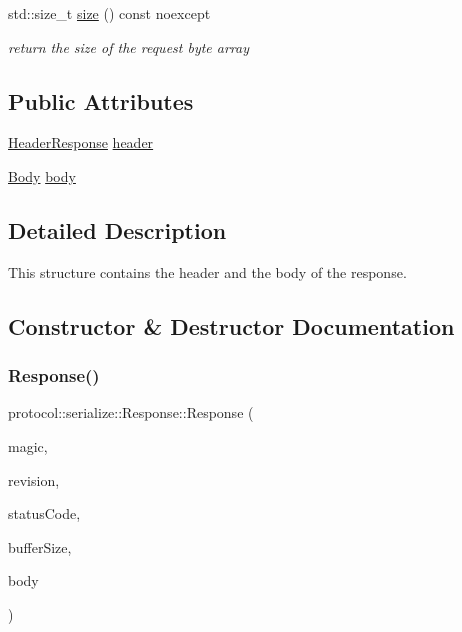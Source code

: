 \begin{DoxyCompactItemize}
\mbox{\label{structprotocol_1_1serialize_1_1_response_ac86f4b18ebeacf1497a14b023c301f62}} 
std\+::size\+\_\+t \hyperlink{structprotocol_1_1serialize_1_1_response_ac86f4b18ebeacf1497a14b023c301f62}{size} () const noexcept
\begin{DoxyCompactList}\small\item\em return the size of the request byte array \end{DoxyCompactList}\end{DoxyCompactItemize}
\subsection*{Public Attributes}
\begin{DoxyCompactItemize}
\item 
\hyperlink{structprotocol_1_1serialize_1_1_header_response}{Header\+Response} \hyperlink{structprotocol_1_1serialize_1_1_response_ad2391bc2916947b5ac734ddaa6570442}{header}
\item 
\hyperlink{classprotocol_1_1serialize_1_1_body}{Body} \hyperlink{structprotocol_1_1serialize_1_1_response_a6706ef7e0a22f2ba78e1b6ff12955568}{body}
\end{DoxyCompactItemize}


\subsection{Detailed Description}
This structure contains the header and the body of the response. 

\subsection{Constructor \& Destructor Documentation}
\mbox{\label{structprotocol_1_1serialize_1_1_response_a3775c0f74e9dafd7a554fa9602b58e76}} 
\subsubsection{\texorpdfstring{Response()}{Response()}\hspace{0.1cm}{\footnotesize\ttfamily [1/2]}}
{\footnotesize\ttfamily protocol\+::serialize\+::\+Response\+::\+Response (\begin{DoxyParamCaption}\item[{char}]{magic,  }\item[{short}]{revision,  }\item[{Status\+Code}]{status\+Code,  }\item[{unsigned}]{buffer\+Size,  }\item[{std\+::initializer\+\_\+list$<$ std\+::string $>$}]{body }\end{DoxyParamCaption})}



